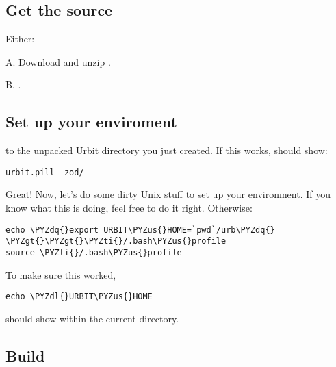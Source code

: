 \subsection{Get the source}

Either:

A. Download and unzip .

B. .

\subsection{Set up your enviroment}

 to the unpacked Urbit directory you just created.  If this works,
 should show:

\begin{framed_shaded}
\begin{Verbatim}[fontsize=\relsize{-2.5},fontseries=b,commandchars=\\\{\}]
urbit.pill  zod/
\end{Verbatim}
\end{framed_shaded}

Great!  Now, let's do some dirty Unix stuff to set up your environment.
If you know what this is doing, feel free to do it right.  Otherwise:

\begin{framed_shaded}
\begin{Verbatim}[fontsize=\relsize{-2.5},fontseries=b,commandchars=\\\{\}]
echo \PYZdq{}export URBIT\PYZus{}HOME=`pwd`/urb\PYZdq{} \PYZgt{}\PYZgt{}\PYZti{}/.bash\PYZus{}profile
source \PYZti{}/.bash\PYZus{}profile
\end{Verbatim}
\end{framed_shaded}

To make sure this worked,

\begin{framed_shaded}
\begin{Verbatim}[fontsize=\relsize{-2.5},fontseries=b,commandchars=\\\{\}]
echo \PYZdl{}URBIT\PYZus{}HOME
\end{Verbatim}
\end{framed_shaded}

should show  within the current directory.

\subsection{Build}

